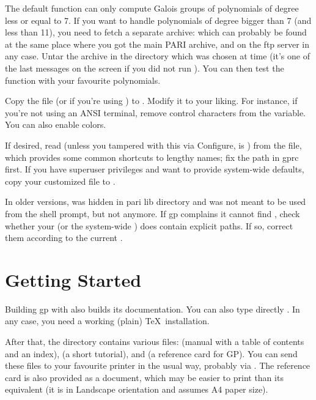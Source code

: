  The default  function can only
compute Galois groups of polynomials of degree less or equal to 7. If you
want to handle polynomials of degree bigger than 7 (and less than 11), you
need to fetch a separate archive:  which can probably be
found at the same place where you got the main PARI archive, and on the
 ftp server in any case. Untar the archive in the 
directory which was chosen at  time (it's one of the last
messages on the screen if you did not run ). You can then
test the  function with your favourite polynomials.

 Copy the file  (or
 if you're using ) to . Modify
it to your liking. For instance, if you're not using an ANSI terminal,
remove control characters from the  variable. You can also
enable colors. 

If desired, read  (unless you tampered with this via
Configure,  is ) from the 
file, which provides some common shortcuts to lengthy names; fix the path in
gprc first. If you have superuser privileges and want to provide system-wide
defaults, copy your customized  file to .

In older versions,  was hidden in pari lib directory and was not
meant to be used from the shell prompt, but not anymore. If gp complains it
cannot find , check whether your  (or the system-wide
) does contain explicit paths. If so, correct them according to the
current .

\section{Getting Started}

 Building gp with  also builds
its documentation. You can also type directly . In any case,
you need a working (plain) \TeX\ installation.

After that, the  directory contains various  files:
 (manual with a table of contents and an index),
 (a short tutorial), and  (a reference
card for GP). You can send these files to your favourite printer in the usual
way, probably via . The reference card is also provided as a
 document, which may be easier to print than its 
equivalent (it is in Landscape orientation and assumes A4 paper size).

